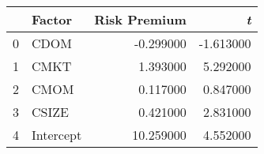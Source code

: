 \begin{tabular}{llrr}
\toprule
 & Factor & Risk Premium & \emph{t} \\
\midrule
0 & CDOM & -0.299000 & -1.613000 \\
1 & CMKT & 1.393000 & 5.292000 \\
2 & CMOM & 0.117000 & 0.847000 \\
3 & CSIZE & 0.421000 & 2.831000 \\
4 & Intercept & 10.259000 & 4.552000 \\
\bottomrule
\end{tabular}
